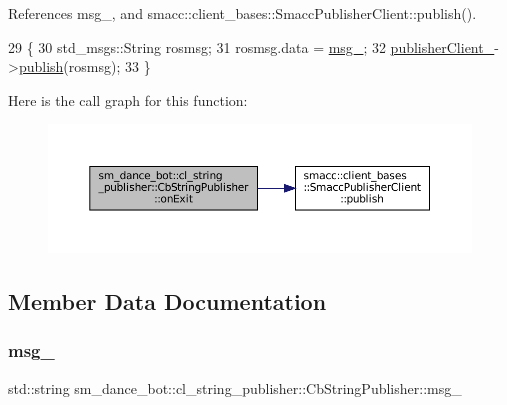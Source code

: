 References msg\+\_\+, and smacc\+::client\+\_\+bases\+::\+Smacc\+Publisher\+Client\+::publish().


\begin{DoxyCode}
29     \{
30         std\_msgs::String rosmsg;
31         rosmsg.data = \hyperlink{classsm__dance__bot_1_1cl__string__publisher_1_1CbStringPublisher_a320ff6940dc15b469af3679d2d2eb655}{msg\_};
32         \hyperlink{classsm__dance__bot_1_1cl__string__publisher_1_1CbStringPublisher_aafcad6e6296a3088cb91ffeb22025bd6}{publisherClient\_}->\hyperlink{classsmacc_1_1client__bases_1_1SmaccPublisherClient_a083abb0f5c0f587f3381a58fe1fe3669}{publish}(rosmsg);
33     \}
\end{DoxyCode}
Here is the call graph for this function\+:
\nopagebreak
\begin{figure}[H]
\begin{center}
\leavevmode
\includegraphics[width=350pt]{classsm__dance__bot_1_1cl__string__publisher_1_1CbStringPublisher_ac93cc1eb150140331cb3e560ec8249e2_cgraph}
\end{center}
\end{figure}


\subsection{Member Data Documentation}
\mbox{\label{classsm__dance__bot_1_1cl__string__publisher_1_1CbStringPublisher_a320ff6940dc15b469af3679d2d2eb655}} 
\subsubsection{\texorpdfstring{msg\+\_\+}{msg\_}}
{\footnotesize\ttfamily std\+::string sm\+\_\+dance\+\_\+bot\+::cl\+\_\+string\+\_\+publisher\+::\+Cb\+String\+Publisher\+::msg\+\_\+}




